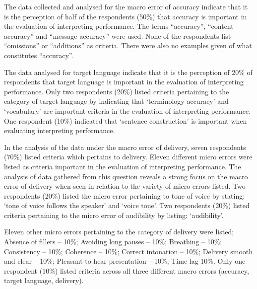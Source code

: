 \documentclass[output=paper]{langsci/langscibook}
\begin{document}
The data collected and analysed for the macro error of accuracy indicate that it is the perception of half of the respondents (50\%) that accuracy is important in the evaluation of interpreting performance. The terms “accuracy”, “content accuracy” and “message accuracy” were used. None of the respondents list “omissions” or “additions” as criteria. There were also no examples given of what constitutes “accuracy”.  

The data analysed for target language indicate that it is the perception of 20\% of respondents that target language is important in the evaluation of interpreting performance. Only two respondents (20\%) listed criteria pertaining to the category of target language by indicating that ‘terminology accuracy’ and ‘vocabulary’ are important criteria in the evaluation of interpreting performance. One respondent (10\%) indicated that ‘sentence construction’ is important when evaluating interpreting performance. 

In the analysis of the data under the macro error of delivery, seven respondents (70\%) listed criteria which pertains to delivery. Eleven different micro errors were listed as criteria important in the evaluation of interpreting performance. The analysis of data gathered from this question reveals a strong focus on the macro error of delivery when seen in relation to the variety of micro errors listed. Two respondents (20\%) listed the micro error pertaining to tone of voice by stating: ‘tone of voice follows the speaker’ and ‘voice tone’. Two respondents (20\%) listed criteria pertaining to the micro error of audibility by listing: ‘audibility’. 

Eleven other micro errors pertaining to the category of delivery were listed; Absence of fillers – 10\%; Avoiding long pauses – 10\%; Breathing – 10\%; Consistency – 10\%; Coherence – 10\%; Correct intonation – 10\%; Delivery smooth and clear – 10\%; Pleasant to hear presentation – 10\%; Time lag 10\%. Only one respondent (10\%) listed criteria across all three different macro errors (accuracy, target language, delivery).
\end{document}
